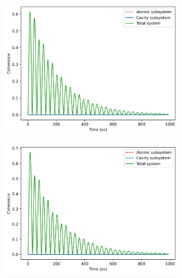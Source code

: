 \documentclass[12pt]{article}
\begin{document}
\begin{figure}[H]
    \centering
    \begin{subfigure}{0.45\textwidth}
        \centering
        \includegraphics[width=\linewidth]{Research Project/Code/results/JCM/OQS_Coh_Spont.png}
        \caption{}
        \label{fig:JCM_OQS_Coh_Spont}
    \end{subfigure}
    \hfill
    \begin{subfigure}{0.45\textwidth}
        \centering
        \includegraphics[width=\linewidth]{Research Project/Code/results/JCM/OQS_Coh_Therm.png}
        \caption{}
        \label{fig:JCM_OQS_Coh_Therm}
    \end{subfigure}
    

\end{figure}
\end{document}

